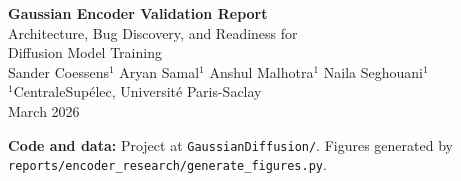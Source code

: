 \documentclass[11pt,a4paper]{article}
\begin{document}
\begin{titlepage}
  \centering
  \vspace*{2cm}

  {\LARGE\bfseries Gaussian Encoder Validation Report}\\[0.6em]
  {\large Architecture, Bug Discovery, and Readiness for\\
   Diffusion Model Training}\\[3em]

  {\large Sander Coessens$^{1}$ \quad Aryan Samal$^{1}$ \quad
          Anshul Malhotra$^{1}$ \quad Naila Seghouani$^{1}$}\\[0.5em]
  {\normalsize $^{1}$CentraleSupélec, Université Paris-Saclay}\\[3em]

  {\large March 2026}\\[2em]

  \begin{abstract}
    
  \end{abstract}

  \vfill
  {\small
    \textbf{Code and data:}
    Project at \texttt{GaussianDiffusion/}.
    Figures generated by \texttt{reports/encoder\_research/generate\_figures.py}.
  }
\end{titlepage}

\tableofcontents
\newpage








\end{document}
